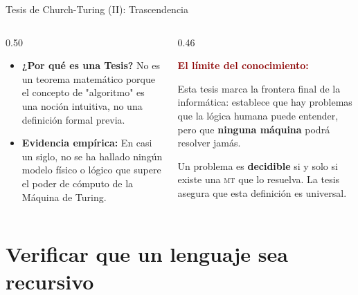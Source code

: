 \documentclass[aspectratio=1610, 12pt]{beamer}
\newcommand{\MT}{\textsc{mt}}
\begin{document}
\begin{frame}[t]{Tesis de Church-Turing (II): Trascendencia}
\vspace{4pt}
\begin{columns}[T]
  \begin{column}{0.50\textwidth}
    \begin{itemize}\small\setlength{\itemsep}{8pt}
      \item \textbf{¿Por qué es una Tesis?} No es un teorema matemático porque el concepto de "algoritmo" es una noción intuitiva, no una definición formal previa.
      \item \textbf{Evidencia empírica:} En casi un siglo, no se ha hallado ningún modelo físico o lógico que supere el poder de cómputo de la Máquina de Turing.
    \end{itemize}
  \end{column}

  \begin{column}{0.46\textwidth}
    \begin{alertbox}
      \small \textcolor{DarkRed}{\textbf{El límite del conocimiento:}}
      
      \vspace{4pt}
      Esta tesis marca la frontera final de la informática: establece que hay problemas que la lógica humana puede entender, pero que \textbf{ninguna máquina} podrá resolver jamás.
    \end{alertbox}

    \vspace{6pt}
    \begin{defbox}
      \scriptsize Un problema es \textbf{decidible} si y solo si existe una \MT{} que lo resuelva. La tesis asegura que esta definición es universal.
    \end{defbox}
  \end{column}
\end{columns}
\end{frame}



\section{Verificar que un lenguaje sea recursivo}
\end{document}
